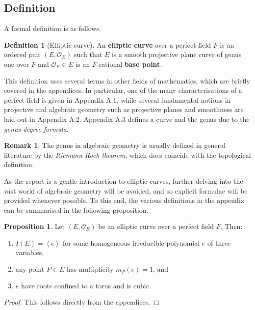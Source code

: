 \documentclass{article}
\newcommand{\rb}[1]{\left( #1 \right)}
\newcommand{\ab}[1]{\left\langle #1 \right\rangle}
\theoremstyle{definition}\newtheorem*{definition}{Definition}
\theoremstyle{definition}\newtheorem*{example}{Example}
\theoremstyle{definition}\newtheorem*{remark}{Remark}
\newtheorem{proposition}{Proposition}[subsection]
\begin{document}
\subsection{Definition}

A formal definition is as follows.

\begin{definition}[Elliptic curve]
An \textbf{elliptic curve} over a perfect field $ F $ is an ordered pair $ \rb{E, \mathcal{O}_E} $ such that $ E $ is a smooth projective plane curve of genus one over $ F $ and $ \mathcal{O}_E \in E $ is an $ F $-rational \textbf{base point}.
\end{definition}

This definition uses several terms in other fields of mathematics, which are briefly covered in the appendices. In particular, one of the many characterisations of a perfect field is given in Appendix A.1, while several fundamental notions in projective and algebraic geometry such as projective planes and smoothness are laid out in Appendix A.2. Appendix A.3 defines a curve and the genus due to the \emph{genus-degree formula}.

\begin{remark}
The genus in algebraic geometry is usually defined in general literature by the \emph{Riemann-Roch theorem}, which does coincide with the topological definition.
\end{remark}

As the report is a gentle introduction to elliptic curves, further delving into the vast world of algebraic geometry will be avoided, and so explicit formulae will be provided whenever possible. To this end, the various definitions in the appendix can be summarised in the following proposition.

\begin{proposition}
\label{prop:appendices}
Let $ \rb{E, \mathcal{O}_E} $ be an elliptic curve over a perfect field $ F $. Then:
\begin{enumerate}
\item $ I\rb{E} = \ab{e} $ for some homogeneous irreducible polynomial $ e $ of three variables,
\item any point $ P \in E $ has multiplicity $ m_P\rb{e} = 1 $, and
\item $ e $ have roots confined to a torus and is cubic.
\end{enumerate}
\end{proposition}

\begin{proof}
This follows directly from the appendices.
\end{proof}
\end{document}
